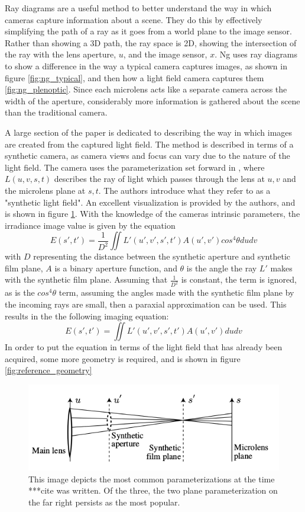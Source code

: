\documentclass[12pt]{report}
\begin{document}
Ray diagrams are a useful method to better understand the way in which cameras capture information about a scene. They do this by effectively simplifying the path of a ray as it goes from a world plane to the image sensor. Rather than showing a 3D path, the ray space is 2D, showing the intersection of the ray with the lens aperture, $u$, and the image sensor, $x$. Ng uses ray diagrams to show a difference in the way a typical camera captures images, as shown in figure \ref{fig:ng_typical}, and then how a light field camera captures them \ref{fig:ng_plenoptic}. Since each microlens acts like a separate camera across the width of the aperture, considerably more information is gathered about the scene than the traditional camera.

A large section of the paper is dedicated to describing the way in which images are created from the captured light field. The method is described in terms of a synthetic camera, as camera views and focus can vary due to the nature of the light field. The camera uses the parameterization set forward in \cite{Levoy96}, where $L(u,v,s,t)$ describes the ray of light which passes through the lens at $u, v$ and the microlens plane at $s, t$. The authors introduce what they refer to as a "synthetic light field". An excellent visualization is provided by the authors, and is shown in figure \ref{fig:synthetic_image_creation}. With the knowledge of the cameras intrinsic parameters, the irradiance image value is given by the equation 
\begin{equation}
E(s',t')=\frac{1}{D^2} \iint L'(u',v',s',t') A(u',v') cos^4\theta du dv
\end{equation}
with $D$ representing the distance between the synthetic aperture and synthetic film plane, $A$ is a binary aperture function, and $\theta$ is the angle the ray $L'$ makes with the synthetic film plane. Assuming that $\frac{1}{D^2}$ is constant, the term is ignored, as is the $cos^4 \theta$ term, assuming the angles made with the synthetic film plane by the incoming rays are small, then a paraxial approximation can be used. This results in the the following imaging equation:
\begin{equation}
E(s',t')=\iint L'(u',v',s',t')A(u',v')dudv
\end{equation}
In order to put the equation in terms of the light field that has already been acquired, some more geometry is required, and is shown in figure \ref{fig:reference_geometry}
\begin{figure}[!ht]
	\centering
	\includegraphics[scale=0.75]{synthetic_image_creation.png}
	\caption{This image depicts the most common parameterizations at the time ***cite was written. Of the three, the two plane parameterization on the far right persists as the most popular.}
	\label{fig:synthetic_image_creation}
\end{figure}
\end{document}
